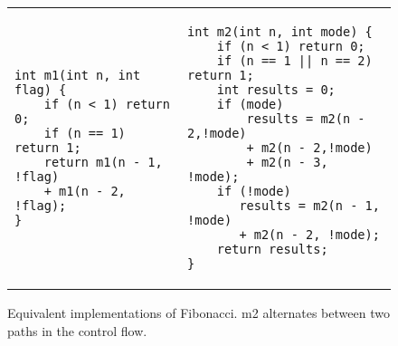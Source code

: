 \begin{figure}
\begin{center}
	\begin{tabular}[t]{ll}
\begin{minipage}[t][5 cm]{5.5 cm}
\begin{lstlisting}
int m1(int n, int flag) {
    if (n < 1) return 0;
    if (n == 1) return 1;
    return m1(n - 1, !flag) 
    + m1(n - 2, !flag);
}
\end{lstlisting}
\end{minipage} 
&
\begin{minipage}[t][5 cm]{6 cm}
\begin{lstlisting}
int m2(int n, int mode) {
    if (n < 1) return 0;
    if (n == 1 || n == 2) return 1;
    int results = 0;
    if (mode)
        results = m2(n - 2,!mode) 
        + m2(n - 2,!mode) 
        + m2(n - 3, !mode);
    if (!mode)
       results = m2(n - 1, !mode) 
       + m2(n - 2, !mode);
    return results;
}
\end{lstlisting}
\end{minipage}
\end{tabular}
\caption{Equivalent implementations of Fibonacci. m2 alternates between two paths in the control flow.}
\label{fig:f1f2switch}
\end{center}
\end{figure}

